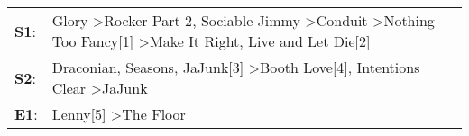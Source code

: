 \begin{supertabular}{p{0.03\textwidth}p{0.92\textwidth}}
 \textbf{S1}:  &  Glory\textsuperscript{} \textgreater \enspace Rocker Part 2\textsuperscript{}, \enspace Sociable Jimmy\textsuperscript{} \textgreater \enspace Conduit\textsuperscript{} \textgreater \enspace Nothing Too Fancy[1]\textsuperscript{} \textgreater \enspace Make It Right\textsuperscript{}, \enspace Live and Let Die[2]\textsuperscript{}  \enspace  \\
 \textbf{S2}:  &                                                                                      Draconian\textsuperscript{}, \enspace Seasons\textsuperscript{}, \enspace JaJunk[3]\textsuperscript{} \textgreater \enspace Booth Love[4]\textsuperscript{}, \enspace Intentions Clear\textsuperscript{} \textgreater \enspace JaJunk\textsuperscript{}  \enspace  \\
 \textbf{E1}:  &                                                                                                                                                                                                                                                                 Lenny[5]\textsuperscript{} \textgreater \enspace The Floor\textsuperscript{}  \enspace  \\
\end{supertabular}
